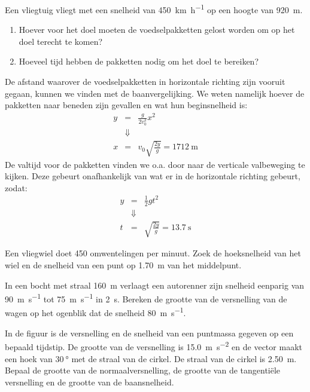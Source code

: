 \documentclass{ximera}
\begin{document}
\begin{exercise}
	Een vliegtuig vliegt met een snelheid van \SI{450}{\kilo\meter\per\hour} op een hoogte van \SI{920}{\meter}.
	\begin{enumerate}
		\item Hoever voor het doel moeten de voedselpakketten gelost worden om op het doel terecht te komen?
		\item Hoeveel tijd hebben de pakketten nodig om het doel te bereiken?
	\end{enumerate}
	\begin{oplossing}
		De afstand waarover de voedselpakketten in horizontale richting zijn vooruit gegaan, kunnen we vinden met de
		baanvergelijking. We weten namelijk hoever de pakketten naar beneden zijn gevallen en wat hun beginsnelheid is:
		\begin{eqnarray*}
			y&=&\frac{g}{2v_0^2}x^2\\
			&\Downarrow&\\
			x&=&v_0\sqrt{\frac{2y}{g}}=\SI{1712}{\meter}%
		\end{eqnarray*}
		De valtijd voor de pakketten vinden we o.a. door naar de verticale valbeweging te kijken. Deze gebeurt onafhankelijk van wat er in de horizontale richting gebeurt, zodat:
		\begin{eqnarray*}
			y&=&\frac{1}{2}gt^2\\
			&\Downarrow&\\
			t&=&\sqrt{\frac{2y}{g}}=\SI{13,7}{\second}%
		\end{eqnarray*}
	\end{oplossing}
\end{exercise}

\begin{exercise}
	Een vliegwiel doet 450 omwentelingen per minuut. Zoek de hoeksnelheid van het wiel en de snelheid van een punt op \SI{1,70}{\meter} van het middelpunt.
\end{exercise}

\begin{exercise}
	In een bocht met straal \SI{160}{\meter} verlaagt een autorenner zijn snelheid eenparig van \SI{90}{\meter\per\second} tot \SI{75}{\meter\per\second} in \SI{2}{\second}. Bereken de grootte van de versnelling van de wagen op het ogenblik dat de snelheid \SI{80}{\meter\per\second}.
\begin{multipleChoice}
\end{multipleChoice}
\end{exercise}

\begin{exercise} 
	In de figuur is de versnelling en de snelheid van een puntmassa gegeven op een bepaald tijdstip. De grootte van de versnelling is \SI{15,0}{\meter\per\second\squared} en de vector maakt een hoek van $\SI{30}{\degree}$ met de straal van de cirkel. De straal van de cirkel is \SI{2,50}{\meter}. Bepaal de grootte van de normaalversnelling, de grootte van de tangentiële versnelling en de grootte van de baansnelheid.
\end{exercise}
\end{document}
